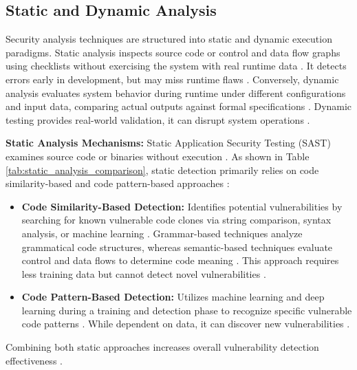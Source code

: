\subsection{Static and Dynamic Analysis}
\label{subsec:static_dynamic_analysis}

Security analysis techniques are structured into static and dynamic execution paradigms. Static analysis inspects source code or control and data flow graphs using checklists without exercising the system with real runtime data \cite[p. 35]{richier2011security}. It detects errors early in development, but may miss runtime flaws \cite[p. 1]{cong2024overview}. Conversely, dynamic analysis evaluates system behavior during runtime under different configurations and input data, comparing actual outputs against formal specifications \cite[p. 35]{richier2011security}. Dynamic testing provides real-world validation, it can disrupt system operations \cite[p. 1]{cong2024overview}.

\textbf{Static Analysis Mechanisms:} Static Application Security Testing (SAST) examines source code or binaries without execution \cite{GeeksforGeeksSecurityTesting}. As shown in Table \ref{tab:static_analysis_comparison}, static detection primarily relies on code similarity-based and code pattern-based approaches \cite[pp. 3]{cong2024overview}:

\begin{itemize}
	\item \textbf{Code Similarity-Based Detection:} Identifies potential vulnerabilities by searching for known vulnerable code clones via string comparison, syntax analysis, or machine learning \cite[p. 3]{cong2024overview}. Grammar-based techniques analyze grammatical code structures, whereas semantic-based techniques evaluate control and data flows to determine code meaning \cite[pp. 4 ]{cong2024overview}. This approach requires less training data but cannot detect novel vulnerabilities \cite[p. 8]{cong2024overview}.
	
	\item \textbf{Code Pattern-Based Detection:} Utilizes machine learning and deep learning during a training and detection phase to recognize specific vulnerable code patterns \cite[p. 5]{cong2024overview}. While dependent on data, it can discover new vulnerabilities \cite[p. 8]{cong2024overview}.
\end{itemize}

Combining both static approaches increases overall vulnerability detection effectiveness \cite[p. 8]{cong2024overview}.

